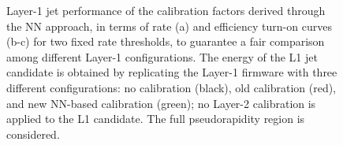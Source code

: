\begin{figure}
    \centering
    
    \caption{Layer-1 jet performance of the calibration factors derived through the NN approach, in terms of rate (a) and efficiency turn-on curves (b-c) for two fixed rate thresholds, to guarantee a fair comparison among different Layer-1 configurations. The energy of the L1 jet candidate is obtained by replicating the Layer-1 firmware with three different configurations: no calibration (black), old calibration (red), and new NN-based calibration (green); no Layer-2 calibration is applied to the L1 candidate. The full pseudorapidity region is considered.}
    \label{fig:NN_HCAL_TurnOn}
\end{figure}

